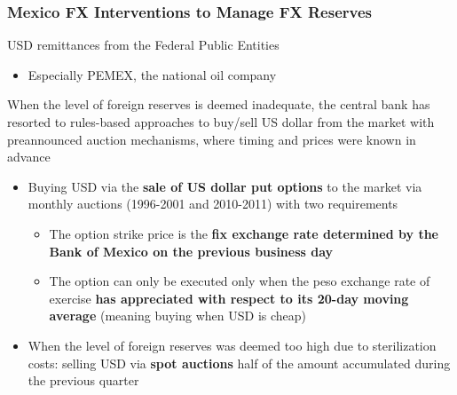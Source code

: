 \documentclass{beamer}
\newenvironment{wideitemize}{\itemize\addtolength{\itemsep}{10pt}}{\enditemize}
\begin{document}
\begin{frame}
  \frametitle{Mexico FX Interventions to Manage FX Reserves}
  \begin{wideitemize}
  \item USD remittances from the Federal Public Entities
    \begin{itemize}
    \item Especially PEMEX, the national oil company
    \end{itemize}
  \item When the level of foreign reserves is deemed inadequate, the central bank has resorted to rules-based approaches to buy/sell US dollar from the market with preannounced auction mechanisms, where timing and prices were known in advance 
    \begin{itemize}
    \item Buying USD via the \textbf{sale of US dollar put options} to the market via monthly auctions (1996-2001 and 2010-2011) with two requirements
      \begin{itemize}
      \item The option strike price is the \textbf{fix exchange rate determined by the Bank of Mexico on the previous business day}
      \item The option can only be executed only when the peso exchange rate of exercise \textbf{has appreciated with respect to its 20-day moving average} (meaning buying when USD is cheap)
      \end{itemize}
    \item When the level of foreign reserves was deemed too high due to sterilization costs: selling USD via \textbf{spot auctions} half of the amount accumulated during the previous quarter
    \end{itemize}
  \end{wideitemize}
\end{frame}
\end{document}
